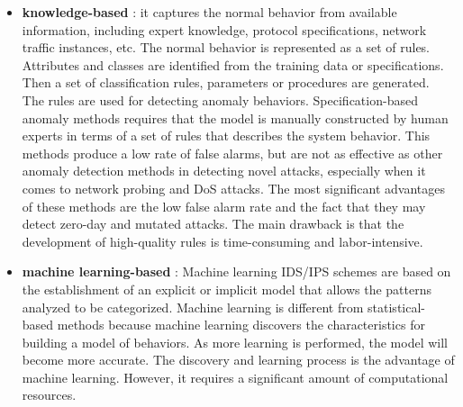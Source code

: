 \documentclass[11pt]{article}
\begin{document}
\begin{itemize}
\item \textbf{knowledge-based} : it captures the normal behavior from available information, including expert knowledge, protocol specifications, network traffic instances, etc. The normal behavior is represented as a set of rules. Attributes and classes are identified from the training data or specifications. Then a set of classification rules, parameters or procedures are generated. The rules are used for detecting anomaly behaviors. Specification-based anomaly methods requires that the model is manually constructed by human experts in terms of a set of rules that describes the system behavior. This methods produce a low rate of false alarms, but are not as effective as other anomaly detection methods in detecting novel attacks, especially when it comes to network probing and DoS attacks. The most significant advantages of these methods are the low false alarm rate and the fact that they may detect zero-day and mutated attacks. The main drawback is that the development of high-quality rules is time-consuming and labor-intensive.
\item \textbf{machine learning-based} : Machine learning IDS/IPS schemes are based on the establishment of an explicit or implicit model that allows the patterns analyzed to be categorized. Machine learning is different from statistical-based methods because machine learning discovers the characteristics for building a model of behaviors. As more learning is performed, the model will become more accurate. The discovery and learning process is the advantage of machine learning. However, it requires a significant amount of computational resources.
\end{itemize}
\end{document}
